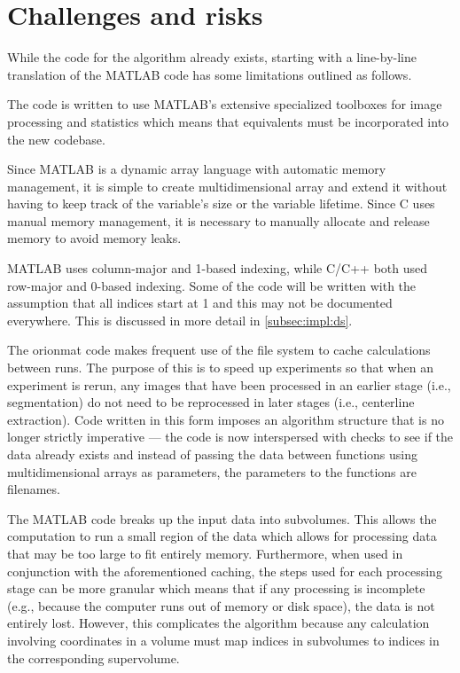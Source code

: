 \section{Challenges and risks}

While the code for the algorithm already exists, starting with a line-by-line
translation of the MATLAB code has some limitations outlined as follows.
\begin{description}[font=\textpluscolon]
\item[Toolbox\label{desc:matlab:toolbox}] The code is written to use MATLAB's extensive 
	specialized toolboxes for image processing and
	statistics which means that equivalents must be
	incorporated into the new codebase.
\item[Memory management\label{desc:matlab:mem}] Since MATLAB is a dynamic array language with
	automatic memory management, it is simple to create
	multidimensional array and extend it without having to
	keep track of the variable's size or the variable
	lifetime. Since C uses manual memory management, it is
	necessary to manually allocate and release memory to avoid
	memory leaks.
\item[Data layout differences]
	MATLAB uses column-major and 1-based indexing, while C/C++
	both used row-major and 0-based indexing. Some of the code
	will be written with the assumption that all indices start
	at 1 and this may not be documented everywhere. This is
	discussed in more detail in \cref{subsec:impl:ds}.
\item[Caching\label{desc:matlab:cache}] The \gls{orionmat} code makes frequent use of the file system
	to cache calculations between runs. The purpose of this is
	to speed up experiments so that when an experiment is
	rerun, any images that have been processed in an earlier
	stage (i.e., segmentation) do not need to be reprocessed
	in later stages (i.e., centerline extraction). Code
	written in this form imposes an algorithm structure
	that is no longer strictly imperative --- the code is now
	interspersed with checks to see if the data already exists
	and instead of passing the data between functions using
	multidimensional arrays as parameters, the parameters to
	the functions are filenames.
\item[Subvolume\label{desc:matlab:subvol}] The MATLAB code breaks up the input data into
	subvolumes. This allows the computation to run a small
	region of the data which allows for processing data that
	may be too large to fit entirely memory. Furthermore, when
	used in conjunction with the aforementioned caching, the
	steps used for each processing stage can be more granular
	which means that if any processing is incomplete (e.g.,
	because the computer runs out of memory or disk space),
	the data is not entirely lost. However, this complicates
	the algorithm because any calculation involving
	coordinates in a volume must map indices in subvolumes to
	indices in the corresponding supervolume.
\end{description}

